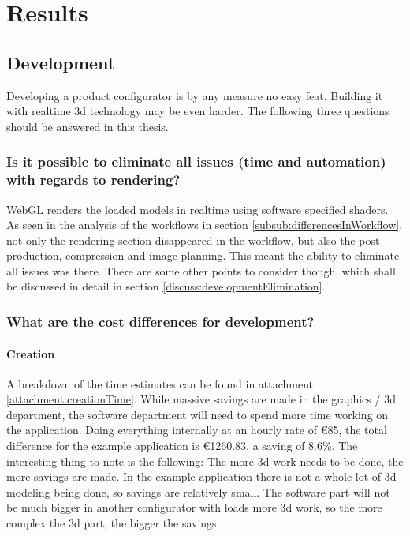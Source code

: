     
    
\chapter{Results}

\section{Development}
Developing a product configurator is by any measure no easy feat. Building it with realtime 3d technology may be even harder. The following three questions should be answered in this thesis.

\subsection {Is it possible to eliminate all issues (time and automation) with regards to rendering?}
WebGL renders the loaded models in realtime using software specified shaders. As seen in the analysis of the workflows in section \ref{subsub:differencesInWorkflow}, not only the rendering section disappeared in the workflow, but also the post production, compression and image planning. This meant the ability to eliminate all issues was there. There are some other points to consider though, which shall be discussed in detail in section \ref{discuss:developmentElimination}.

\subsection{What are the cost differences for development?}
\subsubsection{Creation}
A breakdown of the time estimates can be found in attachment \ref{attachment:creationTime}. While massive savings are made in the graphics / 3d department, the software department will need to spend more time working on the application. Doing everything internally at an hourly rate of €85, the total difference for the example application is €1260.83, a saving of 8.6\%. The interesting thing to note is the following: The more 3d work needs to be done, the more savings are made. In the example application there is not a whole lot of 3d modeling being done, so savings are relatively small. The software part will not be much bigger in another configurator with loads more 3d work, so the more complex the 3d part, the bigger the savings.

